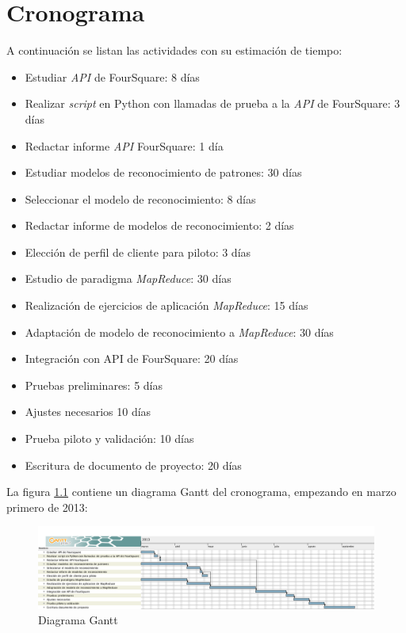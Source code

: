 \chapter{Cronograma}
\label{sec:cronograma}
A continuaci\'on se listan las actividades con su estimaci\'on de tiempo:
\begin{itemize}
\item Estudiar \textit{API} de FourSquare: 8 d\'ias
\item Realizar \textit{script} en Python con llamadas de prueba a la \textit{API} de FourSquare: 3 d\'ias
\item Redactar informe \textit{API} FourSquare: 1 d\'ia
\item Estudiar modelos de reconocimiento de patrones: 30 d\'ias
\item Seleccionar el modelo de reconocimiento: 8 d\'ias
\item Redactar informe de modelos de reconocimiento: 2 d\'ias
\item Elecci\'on de perfil de cliente para piloto: 3 d\'ias
\item Estudio de paradigma \textit{MapReduce}: 30 d\'ias
\item Realizaci\'on de ejercicios de aplicaci\'on \textit{MapReduce}: 15 d\'ias
\item Adaptaci\'on de modelo de reconocimiento a \textit{MapReduce}: 30 d\'ias
\item Integraci\'on con API de FourSquare: 20 d\'ias
\item Pruebas preliminares: 5 d\'ias
\item Ajustes necesarios 10 d\'ias
\item Prueba piloto y validaci\'on: 10 d\'ias
\item Escritura de documento de proyecto: 20 d\'ias
\end{itemize}
La figura \ref{fig:dgantt} contiene un diagrama Gantt del cronograma, empezando en marzo primero de 2013:
\begin{figure}[h]
\begin{center}
\includegraphics[scale=0.3]{./CronogramaProyectoGrado.png}
\end{center}
{\caption{Diagrama Gantt}\label{fig:dgantt}}
\end{figure}

\pagebreak